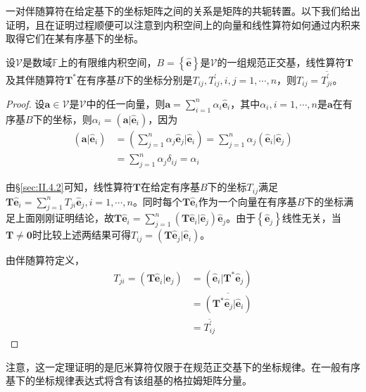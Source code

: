 \documentclass[main.tex]{subfiles}
\begin{document}
一对伴随算符在给定基下的坐标矩阵之间的关系是矩阵的共轭转置。以下我们给出证明，且在证明过程顺便可以注意到内积空间上的向量和线性算符如何通过内积来取得它们在某有序基下的坐标。

\begin{theorem}
    设$\mathcal{V}$是数域$\mathbb{F}$上的有限维内积空间，$B=\left\{\mathbf{\hat{e}}\right\}$是$\mathcal{V}$的一组规范正交基，线性算符$\mathbf{T}$及其伴随算符$\mathbf{T}^*$在有序基$B$下的坐标分别是$T_{ij},T^\prime_{ij},i,j=1,\cdots,n$，则$T_{ij}=\overline{T^\prime_{ji}}$。
\end{theorem}
\begin{proof}
    设$\mathbf{a}\in\mathcal{V}$是$\mathcal{V}$中的任一向量，则$\mathbf{a}=\sum_{i=1}^n\alpha_i\mathbf{\hat{e}}_i$，其中$\alpha_i,i=1,\cdots,n$是$\mathbf{a}$在有序基$B$下的坐标，则$\alpha_i=\left(\mathbf{a}|\mathbf{\hat{e}}_i\right)$，因为
    \begin{align*}
        \left(\mathbf{a}|\mathbf{\hat{e}}_i\right) & =\left(\sum_{j=1}^n\alpha_j\mathbf{\hat{e}}_j|\mathbf{\hat{e}}_i\right)=\sum_{j=1}^n\alpha_j\left(\mathbf{\hat{e}}_i|\mathbf{\hat{e}}_j\right)
        \\&=\sum_{j=1}^n\alpha_j\delta_{ij}=\alpha_i
    \end{align*}

    由\S\ref{sec:II.4.2}可知，线性算符$\mathbf{T}$在给定有序基$B$下的坐标$T_{ij}$满足$\mathbf{T\hat{e}}_i=\sum_{j=1}^nT_{ji}\mathbf{\hat{e}}_j,i=1,\cdots,n$。同时每个$\mathbf{T\hat{e}}_i$作为一个向量在有序基$B$下的坐标满足上面刚刚证明结论，故$\mathbf{T\hat{e}}_i=\sum_{j=1}^n\left(\mathbf{T\hat{e}}_i|\mathbf{\hat{e}}_j\right)\mathbf{\hat{e}}_j$。由于$\left\{\mathbf{\hat{e}}_j\right\}$线性无关，当$\mathbf{T}\neq\mathbf{0}$时比较上述两结果可得$T_{ij}=\left(\mathbf{T\hat{e}}_j|\mathbf{\hat{e}}_i\right)$。

    由伴随算符定义，
    \begin{align*}
        T_{ji}=\left(\mathbf{T\hat{e}}_i|\mathbf{\hat{e}}_j\right) & =\left(\mathbf{\hat{e}}_i|\mathbf{T}^*\mathbf{\hat{e}}_j\right)            \\
                                                                   & =\overline{\left(\mathbf{T}^*\mathbf{\hat{e}}_j|\mathbf{\hat{e}}_i\right)} \\
                                                                   & =\overline{T^\prime_{ij}}
    \end{align*}
\end{proof}

注意，这一定理证明的是厄米算符仅限于在规范正交基下的坐标规律。在一般有序基下的坐标规律表达式将含有该组基的格拉姆矩阵分量。
\end{document}
